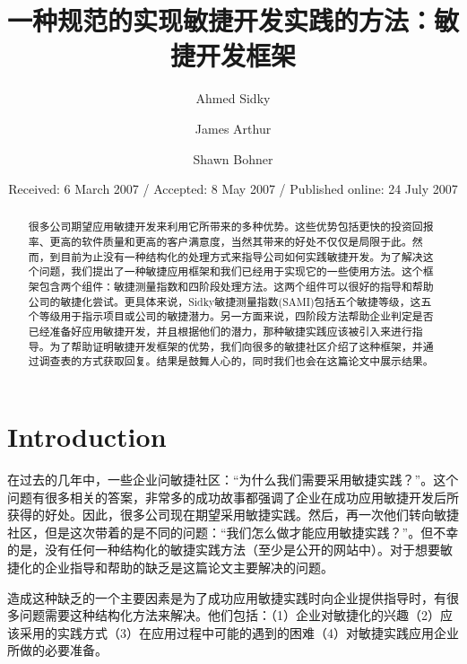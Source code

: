 \documentclass[twocolumn]{svjour3}[]
\begin{document}
\title{一种规范的实现敏捷开发实践的方法：敏捷开发框架}

\author{Ahmed Sidky \and James Arthur \and Shawn Bohner}


\date{Received: 6 March 2007 / Accepted: 8 May 2007 / Published online: 24 July 2007}

\maketitle

\begin{abstract}
很多公司期望应用敏捷开发来利用它所带来的多种优势。这些优势包括更快的投资回报率、更高的软件质量和更高的客户满意度，当然其带来的好处不仅仅是局限于此。然而，到目前为止没有一种结构化的处理方式来指导公司如何实践敏捷开发。为了解决这个问题，我们提出了一种敏捷应用框架和我们已经用于实现它的一些使用方法。这个框架包含两个组件：敏捷测量指数和四阶段处理方法。这两个组件可以很好的指导和帮助公司的敏捷化尝试。更具体来说，Sidky敏捷测量指数(SAMI)包括五个敏捷等级，这五个等级用于指示项目或公司的敏捷潜力。另一方面来说，四阶段方法帮助企业判定是否已经准备好应用敏捷开发，并且根据他们的潜力，那种敏捷实践应该被引入来进行指导。为了帮助证明敏捷开发框架的优势，我们向很多的敏捷社区介绍了这种框架，并通过调查表的方式获取回复。结果是鼓舞人心的，同时我们也会在这篇论文中展示结果。
\end{abstract}

\section{Introduction}
\label{intro}
在过去的几年中，一些企业问敏捷社区：“为什么我们需要采用敏捷实践？”\cite{highsmith2006agile}。这个问题有很多相关的答案，非常多的成功故事都强调了企业在成功应用敏捷开发后所获得的好处\cite{barnett2006agile,barnett2004adopting,kuppuswami2003effects,law2005effects,schatz2005primavera,williams2000strengthening}。因此，很多公司现在期望采用敏捷实践。然后，再一次他们转向敏捷社区，但是这次带着的是不同的问题：“我们怎么做才能应用敏捷实践？”\cite{highsmith2006agile}。但不幸的是，没有任何一种结构化的敏捷实践方法（至少是公开的网站中）。对于想要敏捷化的企业指导和帮助的缺乏是这篇论文主要解决的问题。

造成这种缺乏的一个主要因素是为了成功应用敏捷实践时向企业提供指导时，有很多问题需要这种结构化方法来解决。他们包括：（1）企业对敏捷化的兴趣（2）应该采用的实践方式（3）在应用过程中可能的遇到的困难（4）对敏捷实践应用企业所做的必要准备。
\end{document}
